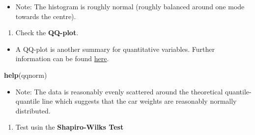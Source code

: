 \documentclass[]{article}
\newenvironment{Shaded}{\begin{snugshade}}{\end{snugshade}}
\newcommand{\DataTypeTok}[1]{\textcolor[rgb]{0.13,0.29,0.53}{#1}}
\newcommand{\KeywordTok}[1]{\textcolor[rgb]{0.13,0.29,0.53}{\textbf{#1}}}
\newcommand{\NormalTok}[1]{#1}
\newcommand{\OperatorTok}[1]{\textcolor[rgb]{0.81,0.36,0.00}{\textbf{#1}}}
\newcommand{\StringTok}[1]{\textcolor[rgb]{0.31,0.60,0.02}{#1}}
\providecommand{\tightlist}{%
  \setlength{\itemsep}{0pt}\setlength{\parskip}{0pt}}
\begin{document}
\begin{itemize}
\tightlist
\item
  Note: The histogram is roughly normal (roughly balanced around one mode towards the centre).
\end{itemize}

\begin{enumerate}
\def\labelenumi{(\arabic{enumi})}
\setcounter{enumi}{1}
\tightlist
\item
  Check the \textbf{QQ-plot}.
\end{enumerate}

\begin{itemize}
\tightlist
\item
  A QQ-plot is another summary for quantitative variables. Further information can be found \href{https://en.wikipedia.org/wiki/Q-Q_plot}{here}.
\end{itemize}

\begin{Shaded}
\begin{Highlighting}[]
\KeywordTok{help}\NormalTok{(qqnorm)}
\end{Highlighting}
\end{Shaded}

\begin{Shaded}
\end{Shaded}

\begin{itemize}
\tightlist
\item
  Note: The data is reasonably evenly scattered around the theoretical quantile-quantile line which suggests that the car weights are reasonably normally distributed.
\end{itemize}

\begin{enumerate}
\def\labelenumi{(\arabic{enumi})}
\setcounter{enumi}{2}
\tightlist
\item
  Test usin the \textbf{Shapiro-Wilks Test}
\end{enumerate}
\end{document}
